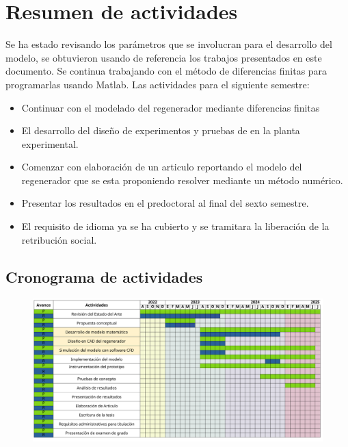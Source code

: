 \documentclass[12pt,letterpaper,final]{article}%
\begin{document}
\section{Resumen de actividades}
Se ha estado revisando los parámetros que se involucran para el desarrollo del modelo, se obtuvieron usando de referencia los trabajos presentados en este documento. Se continua trabajando con el método de diferencias finitas para programarlas usando Matlab.
\newline
Las actividades para el siguiente semestre:
\begin{itemize}
	\item Continuar con el modelado del regenerador mediante diferencias finitas
	\item El desarrollo del diseño de experimentos y pruebas de en la planta experimental.
	\item Comenzar con elaboración de un articulo reportando el modelo del regenerador que se esta proponiendo resolver mediante un método numérico.
	\item Presentar los resultados en el predoctoral al final del sexto semestre.
	\item El requisito de idioma ya se ha cubierto y se tramitara la liberación de la retribución social.
\end{itemize}   

\newpage

\begin{landscape}
	\section{Cronograma de actividades}
	\begin{center}
	\begin{figure}[ht!]
		\includegraphics[scale=0.8]{crono_grama.pdf}
	\end{figure}
	\end{center}	
\end{landscape}

\newpage



	
\end{document}
